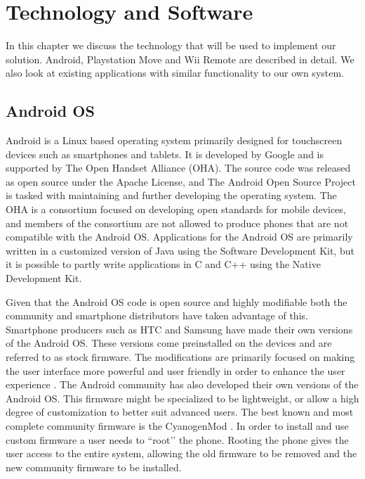 \chapter{Technology and Software}
In this chapter we discuss the technology that will be used to implement our solution. Android, Playstation Move and Wii Remote are described in detail. We also look at existing applications with similar functionality to our own system. 

\section{Android OS}
Android is a Linux based operating system primarily designed for touchscreen devices such as smartphones and tablets. It is developed by Google and is supported by The Open Handset Alliance (OHA). The source code was released as open source under the Apache License, and The Android Open Source Project is tasked with maintaining and further developing the operating system. The OHA is a consortium focused on developing open standards for mobile devices, and members of the consortium are not allowed to produce phones that are not compatible with the Android OS. Applications for the Android OS are primarily written in a customized version of Java using the Software Development Kit, but it is possible to partly write applications in C and C++ using the Native Development Kit. 

Given that the Android OS code is open source and highly modifiable both the community and smartphone distributors have taken advantage of this. Smartphone producers such as HTC and Samsung have made their own versions of the Android OS. These versions come preinstalled on the devices and are referred to as stock firmware. The modifications are primarily focused on making the user interface more powerful and user friendly in order to enhance the user experience \cite{htcSense}. The Android community has also developed their own versions of the Android OS. This firmware might be specialized to be lightweight, or allow a high degree of customization to better suit advanced users. The best known and most complete community firmware is the CyanogenMod \cite{cyanogenmod}. In order to install and use custom firmware a user needs to ``root’’ the phone. Rooting the phone gives the user access to the entire system, allowing the old firmware to be removed and the new community firmware to be installed.

